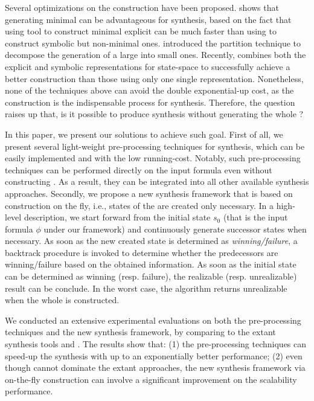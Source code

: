 Several optimizations on the \dfa construction have been proposed. \citep{ZTLPV17} shows that generating minimal \dfa can be advantageous for \ltlf synthesis, based on the fact that using \mona tool \citep{HJJKPRS95,EKM98} to construct minimal explicit \dfa can be much faster than using \spot \citep{DP04} to construct symbolic but non-minimal ones. \citep{TV19} introduced the partition technique to decompose the generation of a large \dfa into small ones\citep{MSL18}. Recently, \citep{BLTV20} combines both the explicit and symbolic representations for \dfa state-space to successfully achieve a better \dfa construction than those using only one single representation. Nonetheless, none of the techniques above can avoid the double exponential-up cost, as the \dfa construction is the 
indispensable process for \ltlf synthesis. Therefore, the question raises up that, is it possible to produce \ltlf synthesis without generating the whole \dfa? 

In this paper, we present our solutions to achieve such goal. First of all, we present several light-weight pre-processing techniques for \ltlf synthesis, which can be easily implemented and with the low running-cost. Notably, such pre-processing techniques can be performed directly on the input formula even without constructing \dfa. As a result, they can be integrated into all other available \ltlf synthesis approaches. Secondly, we propose a new synthesis framework that is based on \dfa construction on the fly, i.e., states of the \dfa are created only necessary. In a high-level description, we start forward from the initial state $s_0$ (that is the input formula $\phi$ under our framework)  and continuously generate successor states when necessary. As soon as the new created state is determined as \emph{winning/failure}, a backtrack procedure is invoked to determine whether the predecessors are winning/failure based on the obtained information. As soon as the initial state can be determined as winning (resp. failure), the realizable (resp. unrealizable) result can be conclude. In the worst case, the algorithm returns unrealizable when the whole \dfa is constructed. 

We conducted an extensive experimental evaluations on both the pre-processing techniques and the new synthesis framework, by comparing to the extant \ltlf synthesis tools \syft\citep{ZTLPV17} and \lisasyft \citep{BLTV20}. The results show that: (1) the pre-processing techniques can speed-up the synthesis with up to an exponentially better performance; (2) even though cannot dominate the extant approaches, the new synthesis framework via on-the-fly \dfa construction can involve a significant improvement on the scalability performance.  